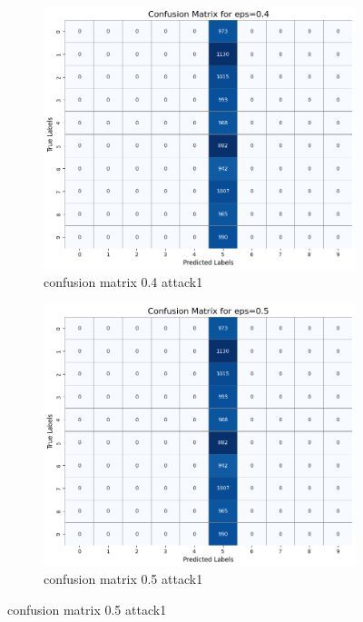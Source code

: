 \documentclass[11pt,onside]{article}
\begin{document}
\begin{figure}[h]
  \centering
  \begin{subfigure}[b]{0.49\textwidth}
    \centering
    \includegraphics[width=\textwidth]{V2_images/confusion_matrix_eps_0.4_attack_1.png}
    \caption{confusion matrix 0.4 attack1}
    \label{fig:image1}
  \end{subfigure}
  \hfill
  \begin{subfigure}[b]{0.49\textwidth}
    \centering
    \includegraphics[width=\textwidth]{V2_images/confusion_matrix_eps_0.5_attack_1.png}
    \caption{confusion matrix 0.5 attack1}
    \label{fig:image2}
  \end{subfigure}
  \label{fig:images}
\end{figure}
\end{document}
